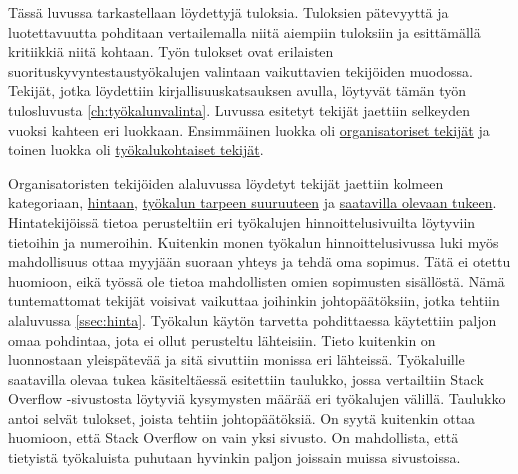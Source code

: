 Tässä luvussa tarkastellaan löydettyjä tuloksia. Tuloksien pätevyyttä ja luotettavuutta pohditaan vertailemalla niitä aiempiin tuloksiin ja esittämällä kritiikkiä niitä kohtaan. Työn tulokset ovat erilaisten suorituskyvyntestaustyökalujen valintaan vaikuttavien tekijöiden muodossa. Tekijät, jotka löydettiin kirjallisuuskatsauksen avulla, löytyvät tämän työn tulosluvusta \ref{ch:työkalunvalinta}. Luvussa esitetyt tekijät jaettiin selkeyden vuoksi kahteen eri luokkaan. Ensimmäinen luokka oli \hyperref[sec:organisatorisettekijät]{organisatoriset tekijät} ja toinen luokka oli \hyperref[sec:työkalukohtaisettekijät]{työkalukohtaiset tekijät}. 

Organisatoristen tekijöiden alaluvussa löydetyt tekijät jaettiin kolmeen kategoriaan, \hyperref[ssec:hinta]{hintaan}, \hyperref[ssec:tarpeensuuruus]{työkalun tarpeen suuruuteen} ja \hyperref[ssec:tuki]{saatavilla olevaan tukeen}. Hintatekijöissä tietoa perusteltiin eri työkalujen hinnoittelusivuilta löytyviin tietoihin ja numeroihin. Kuitenkin monen työkalun hinnoittelusivussa luki myös mahdollisuus ottaa myyjään suoraan yhteys ja tehdä oma sopimus. Tätä ei otettu huomioon, eikä työssä ole tietoa mahdollisten omien sopimusten sisällöstä. Nämä tuntemattomat tekijät voisivat vaikuttaa joihinkin johtopäätöksiin, jotka tehtiin alaluvussa \ref{ssec:hinta}. Työkalun käytön tarvetta pohdittaessa käytettiin paljon omaa pohdintaa, jota ei ollut perusteltu lähteisiin. Tieto kuitenkin on luonnostaan yleispätevää ja sitä sivuttiin monissa eri lähteissä. Työkaluille saatavilla olevaa tukea käsiteltäessä esitettiin taulukko, jossa vertailtiin Stack Overflow -sivustosta löytyviä kysymysten määrää eri työkalujen välillä. Taulukko antoi selvät tulokset, joista tehtiin johtopäätöksiä. On syytä kuitenkin ottaa huomioon, että Stack Overflow on vain yksi sivusto. On mahdollista, että tietyistä työkaluista puhutaan hyvinkin paljon joissain muissa sivustoissa. 

